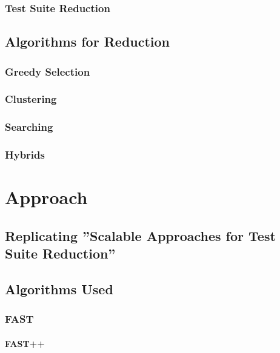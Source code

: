 \documentclass[a4paper,10pt]{article}
\begin{document}
\subsubsection{Test Suite Reduction}

\subsection{Algorithms for Reduction}

\subsubsection{Greedy Selection}


\subsubsection{Clustering}


\subsubsection{Searching}

\subsubsection{Hybrids}

\section{Approach}

\subsection{Replicating ''Scalable Approaches for Test Suite Reduction''}

\subsection{Algorithms Used}

\subsubsection{FAST}

\paragraph{FAST++}
\end{document}
